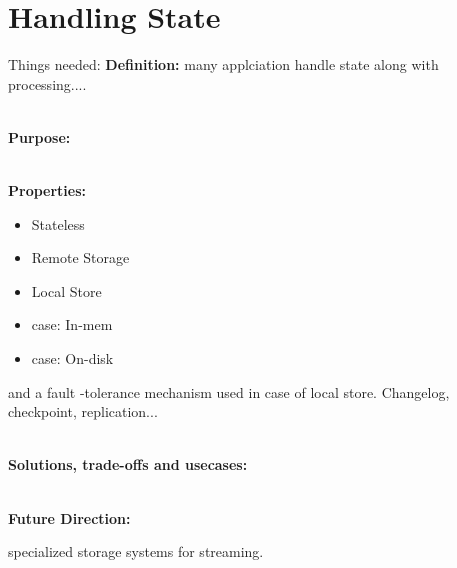 \section{Handling State}
\label{sec:state}



	


Things needed: 
\noindent\textbf{Definition:}  many applciation handle state along with processing....

\noindent \textbf{\\Purpose:} 


\noindent \textbf{\\Properties:}

\begin{itemize}
\item  Stateless
\item  Remote Storage
\item  Local Store
\item  case: In-mem
\item case: On-disk
\end{itemize}

and a fault -tolerance mechanism used in case of local store. Changelog, checkpoint, replication...



\noindent \textbf{\\Solutions, trade-offs and usecases:}

\begin{table}[h]
\end{table}


\noindent \textbf{\\Future Direction:}  

specialized storage systems for streaming.

